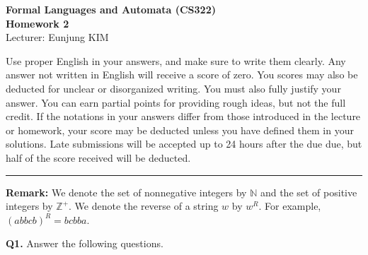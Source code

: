 \documentclass{article}
\begin{document}
\begin{tcolorbox}[
    colback=white,
    colframe=black,
    boxrule=1pt,
    sharp corners,
    halign=center
]
    \large\textbf{Formal Languages and Automata (CS322)} \\
    \vspace{2mm}
    \large\textbf{Homework 2} \\
    \vspace{2mm}
    Lecturer: Eunjung KIM
\end{tcolorbox}

\par
Use proper English in your answers, and make sure to write them clearly. Any answer not written in English will receive a score of zero. You scores may also be deducted for unclear or disorganized writing. You must also fully justify your answer. You can earn partial points for providing rough ideas, but not the full credit. If the notations in your answers differ from those introduced in the lecture or homework, your score may be deducted unless you have defined them in your solutions. Late submissions will be accepted up to 24 hours after the due due, but half of the score received will be deducted.

\vspace{5mm}
\hrule
\vspace{5mm}

\noindent\textbf{Remark:} We denote the set of nonnegative integers by $\mathbb{N}$ and the set of positive integers by $\mathbb{Z}^{+}$. We denote the reverse of a string $w$ by $w^R$. For example, $(abbcb)^R = bcbba$.

\vspace{5mm}
\noindent\textbf{Q1.} Answer the following questions.

\begin{center}
\end{center}
\end{document}
